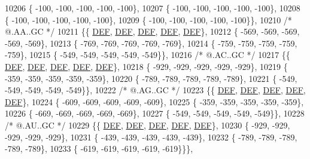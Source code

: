 \begin{DoxyCode}
10206 \{ -100, -100, -100, -100, -100\},
10207 \{ -100, -100, -100, -100, -100\},
10208 \{ -100, -100, -100, -100, -100\},
10209 \{ -100, -100, -100, -100, -100\}\},
10210 \textcolor{comment}{/*  @.AA..GC */}
10211 \{\{  \mbox{\hyperlink{1_88_84__epars_8h_a397419fc12b37ed479c8abb9d444d843}{DEF}},  \mbox{\hyperlink{1_88_84__epars_8h_a397419fc12b37ed479c8abb9d444d843}{DEF}},  \mbox{\hyperlink{1_88_84__epars_8h_a397419fc12b37ed479c8abb9d444d843}{DEF}},  \mbox{\hyperlink{1_88_84__epars_8h_a397419fc12b37ed479c8abb9d444d843}{DEF}},  \mbox{\hyperlink{1_88_84__epars_8h_a397419fc12b37ed479c8abb9d444d843}{DEF}}\},
10212 \{ -569, -569, -569, -569, -569\},
10213 \{ -769, -769, -769, -769, -769\},
10214 \{ -759, -759, -759, -759, -759\},
10215 \{ -549, -549, -549, -549, -549\}\},
10216 \textcolor{comment}{/*  @.AC..GC */}
10217 \{\{  \mbox{\hyperlink{1_88_84__epars_8h_a397419fc12b37ed479c8abb9d444d843}{DEF}},  \mbox{\hyperlink{1_88_84__epars_8h_a397419fc12b37ed479c8abb9d444d843}{DEF}},  \mbox{\hyperlink{1_88_84__epars_8h_a397419fc12b37ed479c8abb9d444d843}{DEF}},  \mbox{\hyperlink{1_88_84__epars_8h_a397419fc12b37ed479c8abb9d444d843}{DEF}},  \mbox{\hyperlink{1_88_84__epars_8h_a397419fc12b37ed479c8abb9d444d843}{DEF}}\},
10218 \{ -929, -929, -929, -929, -929\},
10219 \{ -359, -359, -359, -359, -359\},
10220 \{ -789, -789, -789, -789, -789\},
10221 \{ -549, -549, -549, -549, -549\}\},
10222 \textcolor{comment}{/*  @.AG..GC */}
10223 \{\{  \mbox{\hyperlink{1_88_84__epars_8h_a397419fc12b37ed479c8abb9d444d843}{DEF}},  \mbox{\hyperlink{1_88_84__epars_8h_a397419fc12b37ed479c8abb9d444d843}{DEF}},  \mbox{\hyperlink{1_88_84__epars_8h_a397419fc12b37ed479c8abb9d444d843}{DEF}},  \mbox{\hyperlink{1_88_84__epars_8h_a397419fc12b37ed479c8abb9d444d843}{DEF}},  \mbox{\hyperlink{1_88_84__epars_8h_a397419fc12b37ed479c8abb9d444d843}{DEF}}\},
10224 \{ -609, -609, -609, -609, -609\},
10225 \{ -359, -359, -359, -359, -359\},
10226 \{ -669, -669, -669, -669, -669\},
10227 \{ -549, -549, -549, -549, -549\}\},
10228 \textcolor{comment}{/*  @.AU..GC */}
10229 \{\{  \mbox{\hyperlink{1_88_84__epars_8h_a397419fc12b37ed479c8abb9d444d843}{DEF}},  \mbox{\hyperlink{1_88_84__epars_8h_a397419fc12b37ed479c8abb9d444d843}{DEF}},  \mbox{\hyperlink{1_88_84__epars_8h_a397419fc12b37ed479c8abb9d444d843}{DEF}},  \mbox{\hyperlink{1_88_84__epars_8h_a397419fc12b37ed479c8abb9d444d843}{DEF}},  \mbox{\hyperlink{1_88_84__epars_8h_a397419fc12b37ed479c8abb9d444d843}{DEF}}\},
10230 \{ -929, -929, -929, -929, -929\},
10231 \{ -439, -439, -439, -439, -439\},
10232 \{ -789, -789, -789, -789, -789\},
10233 \{ -619, -619, -619, -619, -619\}\}\},

\end{DoxyCode}
